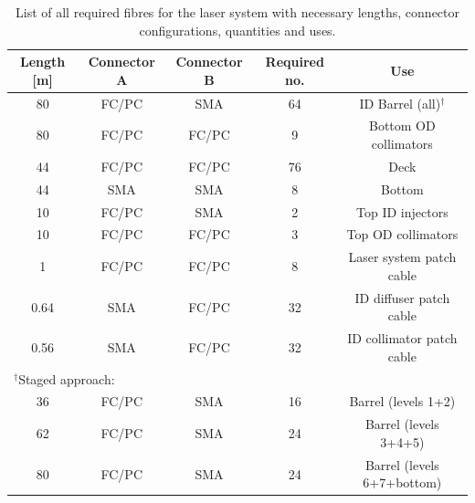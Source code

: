 \documentclass[a4paper,11pt]{article}
\begin{document}
\begin{table}[h]
\centering
\setlength{\tabcolsep}{4pt}
\begin{tabular}{ccccc}
\toprule
Length [m]	&	Connector A	&	Connector B	&	Required no.	&	Use		\\ \midrule
80			&	FC/PC		&	SMA			&	64				&	ID Barrel (all)$^\dagger$	\\
80			&	FC/PC		&	FC/PC		&	9				&	Bottom OD collimators \\
44			&	FC/PC		&	FC/PC		&	76				&	Deck	\\
44			&	SMA			&	SMA			&	8				&	Bottom	\\
10			&	FC/PC		&	SMA			&	2				&	Top ID injectors \\
10			&	FC/PC		&	FC/PC		&	3				&	Top OD collimators \\
1			&	FC/PC		&	FC/PC		&	8				&	Laser system patch cable \\
0.64		&	SMA			&	FC/PC		&	32				&	ID diffuser patch cable	\\
0.56		&	SMA			&	FC/PC		&	32				&	ID collimator patch cable	\\ \midrule
\multicolumn{3}{l}{$^\dagger$Staged approach:}			&					&			\\
36			&	FC/PC		&	SMA			&	16				&	Barrel (levels 1+2) \\
62			&	FC/PC		&	SMA			&	24				&	Barrel (levels 3+4+5)	\\
80			&	FC/PC		&	SMA			&	24				&	Barrel (levels 6+7+bottom)	\\
\bottomrule
\end{tabular}
\caption{List of all required fibres for the laser system with necessary lengths, connector configurations, quantities and uses.}\label{tab:fibreSummaryLaser}
\end{table}
\end{document}
